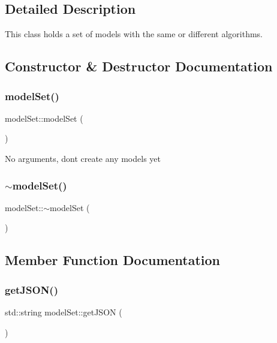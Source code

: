 \subsection{Detailed Description}
This class holds a set of models with the same or different algorithms. 

\subsection{Constructor \& Destructor Documentation}
\mbox{\label{classmodel_set_ae44cba85f4c52e7d05e0f622b3ea9030}} 
\subsubsection{\texorpdfstring{model\+Set()}{modelSet()}}
{\footnotesize\ttfamily model\+Set\+::model\+Set (\begin{DoxyParamCaption}{ }\end{DoxyParamCaption})}

No arguments, don\textquotesingle{}t create any models yet \mbox{\label{classmodel_set_a21eadb6e6cdd54dda57a4a94582bfe7b}} 
\subsubsection{\texorpdfstring{$\sim$model\+Set()}{~modelSet()}}
{\footnotesize\ttfamily model\+Set\+::$\sim$model\+Set (\begin{DoxyParamCaption}{ }\end{DoxyParamCaption})}



\subsection{Member Function Documentation}
\mbox{\label{classmodel_set_a031987885b1462ec7d7dbeef0c803d97}} 
\subsubsection{\texorpdfstring{get\+J\+S\+O\+N()}{getJSON()}}
{\footnotesize\ttfamily std\+::string model\+Set\+::get\+J\+S\+ON (\begin{DoxyParamCaption}{ }\end{DoxyParamCaption})}

